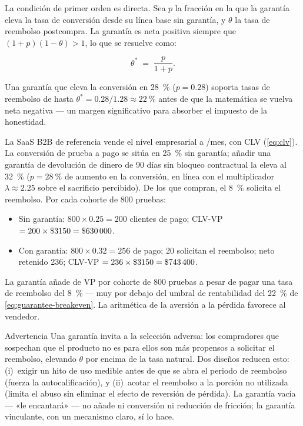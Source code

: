 La condición de primer orden es directa. Sea $p$ la fracción en la que la garantía eleva la
tasa de conversión desde su línea base sin garantía, y $\theta$ la tasa de reembolso
postcompra. La garantía es neta positiva siempre que $(1+p)(1-\theta) > 1$, lo que se resuelve
como:

\begin{equation}\label{eq:guarantee-breakeven}
  \theta^{*} \;=\; \frac{p}{1+p}.
\end{equation}

Una garantía que eleva la conversión en \qty{28}{\percent} ($p = 0.28$) soporta tasas de
reembolso de hasta $\theta^{*} = 0.28/1.28 \approx \qty{22}{\percent}$ antes de que la
matemática se vuelva neta negativa --- un margen significativo para absorber el impuesto
de la honestidad.

\begin{example}
La SaaS B2B de referencia vende el nivel empresarial a /mes, con CLV 
(\cref{eq:clv}). La conversión de prueba a pago se sitúa en \qty{25}{\percent} sin garantía;
añadir una garantía de devolución de dinero de \num{90} días sin bloqueo contractual la eleva
al \qty{32}{\percent} ($p = \qty{28}{\percent}$ de aumento en la conversión, en línea con el
multiplicador $\lambda \approx 2.25$ sobre el sacrificio percibido). De los que compran, el
\qty{8}{\percent} solicita el reembolso. Por cada cohorte de 800 pruebas:

\begin{itemize}
  \item Sin garantía: $800 \times 0.25 = 200$ clientes de pago; CLV-VP $= 200 \times \$\num{3150} = \$\num{630000}$.
  \item Con garantía: $800 \times 0.32 = 256$ de pago; \num{20} solicitan el reembolso; neto retenido \num{236}; CLV-VP $= 236 \times \$\num{3150} = \$\num{743400}$.
\end{itemize}

La garantía añade  de VP por cohorte de 800 pruebas a pesar de pagar una tasa
de reembolso del \qty{8}{\percent} --- muy por debajo del umbral de rentabilidad del
\qty{22}{\percent} de \cref{eq:guarantee-breakeven}. La aritmética de la aversión a la pérdida
favorece al vendedor.
\end{example}

\begin{admonition}{Advertencia}
Una garantía invita a la selección adversa: los compradores que sospechan que el producto no
es para ellos son más propensos a solicitar el reembolso, elevando $\theta$ por encima de la
tasa natural. Dos diseños reducen esto: (i)~exigir un hito de uso medible antes de que se
abra el periodo de reembolso (fuerza la autocalificación), y (ii)~acotar el reembolso a la
porción no utilizada (limita el abuso sin eliminar el efecto de reversión de pérdida). La
garantía vacía --- «le encantará» --- no añade ni conversión ni reducción de fricción; la
garantía vinculante, con un mecanismo claro, sí lo hace.
\end{admonition}

